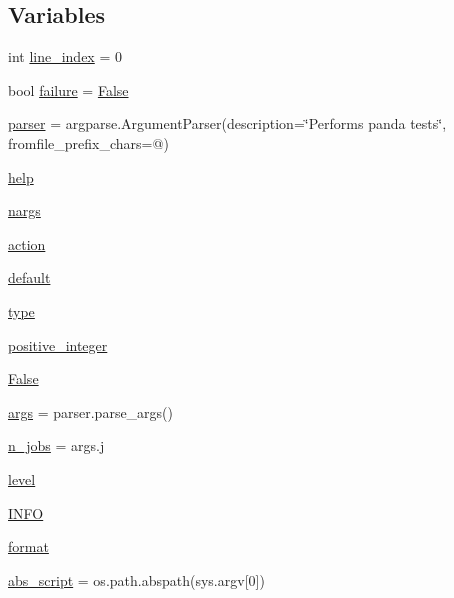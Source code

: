 \subsection*{Variables}
\begin{DoxyCompactItemize}
\item 
int \hyperlink{namespacetest__panda_a17f5ccc2e9f9243e40acfb0b497282ac}{line\+\_\+index} = 0
\item 
bool \hyperlink{namespacetest__panda_a03abeca3a5e7cb965926a2d7daf20869}{failure} = \hyperlink{namespacetest__panda_af93daddc6b1a54e0ad3c68aa4c89eb92}{False}
\item 
\hyperlink{namespacetest__panda_a9be83b1904aaf2557970fcb731bd6d2e}{parser} = argparse.\+Argument\+Parser(description=\char`\"{}Performs panda tests\char`\"{}, fromfile\+\_\+prefix\+\_\+chars=\textquotesingle{}@\textquotesingle{})
\item 
\hyperlink{namespacetest__panda_a2a83a208c85465f56398e300d330dfc3}{help}
\item 
\hyperlink{namespacetest__panda_a2c3b827ff02e8b5a6fc657d80c20d90e}{nargs}
\item 
\hyperlink{namespacetest__panda_a164944f1df8c7c37365132a9aef1facf}{action}
\item 
\hyperlink{namespacetest__panda_a7fd30363398ea25814ee1b587739f2e0}{default}
\item 
\hyperlink{namespacetest__panda_ad251691de7e6ced00a5792a406f11098}{type}
\item 
\hyperlink{namespacetest__panda_a22223479047f14974bf2c5287be2c411}{positive\+\_\+integer}
\item 
\hyperlink{namespacetest__panda_af93daddc6b1a54e0ad3c68aa4c89eb92}{False}
\item 
\hyperlink{namespacetest__panda_aaa97e5cb55582d83d04e62d4a024c9e8}{args} = parser.\+parse\+\_\+args()
\item 
\hyperlink{namespacetest__panda_aa5fd25c613bf73eb86bd917d77eaa028}{n\+\_\+jobs} = args.\+j
\item 
\hyperlink{namespacetest__panda_a1b2d6c88abc84e07978e8c994c6d91cf}{level}
\item 
\hyperlink{namespacetest__panda_a45eb84e3f3dca7bfa3dfed6fa7d6f3a5}{I\+N\+FO}
\item 
\hyperlink{namespacetest__panda_a6f835898965d6dbfb876b0e354269102}{format}
\item 
\hyperlink{namespacetest__panda_af4105d119e28aa4a94138bf46ab86177}{abs\+\_\+script} = os.\+path.\+abspath(sys.\+argv\mbox{[}0\mbox{]})
\item 

\end{DoxyCompactItemize}
